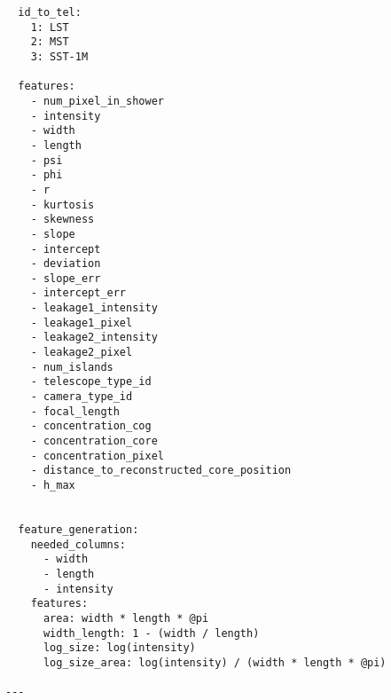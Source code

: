 \begin{lstlisting}
  id_to_tel:
    1: LST
    2: MST
    3: SST-1M 

  features:
    - num_pixel_in_shower
    - intensity
    - width
    - length
    - psi
    - phi
    - r
    - kurtosis
    - skewness
    - slope
    - intercept
    - deviation
    - slope_err
    - intercept_err
    - leakage1_intensity
    - leakage1_pixel
    - leakage2_intensity
    - leakage2_pixel
    - num_islands
    - telescope_type_id
    - camera_type_id
    - focal_length
    - concentration_cog
    - concentration_core
    - concentration_pixel
    - distance_to_reconstructed_core_position
    - h_max


  feature_generation:
    needed_columns:
      - width
      - length
      - intensity
    features:
      area: width * length * @pi
      width_length: 1 - (width / length)
      log_size: log(intensity)
      log_size_area: log(intensity) / (width * length * @pi)

---
\end{lstlisting}
